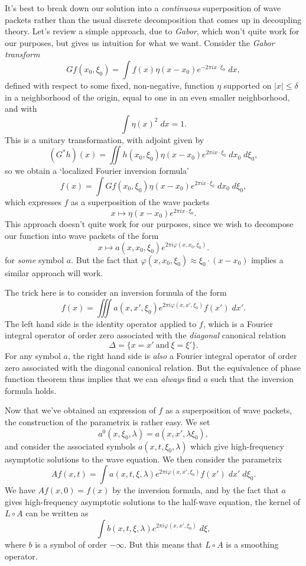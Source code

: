 \documentclass{article}
\theoremstyle{plain}
\theoremstyle{remark}
\theoremstyle{definition}
\begin{document}
It's best to break down our solution into a \emph{continuous} superposition of wave packets rather than the usual discrete decomposition that comes up in decoupling theory. Let's review a simple approach, due to \emph{Gabor}, which won't quite work for our purposes, but gives us intuition for what we want. Consider the \emph{Gabor transform}
%
\[ Gf(x_0,\xi_0) = \int f(x) \eta(x - x_0) e^{- 2 \pi i x \cdot \xi_0}\; dx, \]
%
defined with respect to some fixed, non-negative, function $\eta$ supported on $|x| \leq \delta$ in a neighborhood of the origin, equal to one in an even smaller neighborhood, and with
%
\[ \int \eta(x)^2\; dx = 1. \]
%
This is a unitary transformation, with adjoint given by
%
\[ (G^*h)(x) = \iint h(x_0,\xi_0) \eta(x - x_0) e^{2 \pi i x \cdot \xi_0}\; dx_0\; d\xi_0, \]
%
so we obtain a `localized Fourier inversion formula'
%
\[ f(x) = \int Gf(x_0,\xi_0) \eta(x - x_0) e^{2 \pi i x \cdot \xi_0}\; dx_0\; d\xi_0, \]
%
which expresses $f$ as a superposition of the wave packets
%
\[ x \mapsto \eta(x - x_0) e^{2 \pi i x \cdot \xi_0}. \]
%
This approach doesn't quite work for our purposes, since we wish to decompose our function into wave packets of the form
%
\[ x \mapsto a(x,x_0,\xi_0) e^{2 \pi i \varphi(x,x_0,\xi_0)}. \]
%
for \emph{some} symbol $a$. But the fact that $\varphi(x,x_0,\xi_0) \approx \xi_0 \cdot (x - x_0)$ implies a similar approach will work.

The trick here is to consider an inversion formula of the form
%
\[ f(x) = \iiint a(x,x',\xi_0) e^{2 \pi i \varphi(x,x',\xi_0)} f(x')\; dx'. \]
%
The left hand side is the identity operator applied to $f$, which is a Fourier integral operator of order zero associated with the \emph{diagonal} canonical relation
%
\[ \Delta = \Big\{ x = x'\ \text{and}\ \xi = \xi' \Big\}. \]
%
For any symbol $a$, the right hand side is \emph{also} a Fourier integral operator of order zero associated with the diagonal canonical relation. But the equivalence of phase function theorem thus implies that we can \emph{always} find $a$ such that the inversion formula holds.

Now that we've obtained an expression of $f$ as a superposition of wave packets, the construction of the parametrix is rather easy. We set
%
\[ a^0(x,\xi_0,\lambda) = a(x,x', \lambda \xi_0), \]
%
and consider  the associated symbols $a(x,t,\xi_0,\lambda)$ which give high-frequency asymptotic solutions to the wave equation. We then consider the parametrix
%
\[ Af(x,t) = \int a(x,t,\xi,\lambda) e^{2 \pi i \varphi(x,x',\xi_0)} f(x')\; dx'\; d\xi_0. \]
%
We have $Af(x,0) = f(x)$ by the inversion formula, and by the fact that $a$ gives high-frequency asymptotic solutions to the half-wave equation, the kernel of $L \circ A$ can be written as
%
\[ \int b(x,t,\xi,\lambda) e^{2 \pi i \varphi(x,x',\xi_0)}\; d\xi, \]
%
where $b$ is a symbol of order $-\infty$. But this means that $L \circ A$ is a smoothing operator.
\end{document}

